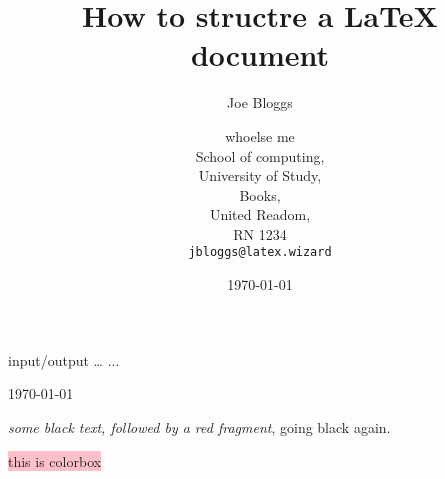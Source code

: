 \documentclass{article}
\title{How to structre a \LaTeX{} document}
\author{Joe Bloggs \and whoelse me \\
        School of computing, \\
        University of Study, \\
        Books, \\
        United Readom, \\
        RN 1234\\
        \texttt{jbloggs@latex.wizard}}
\date{\today}
\begin{document}
    \maketitle


    input\slash output
    \ldots
    ...

    \today

    \emph{some black text, \color{red} followed by a red fragment}, going black again.

    \colorbox{pink}{this is colorbox}
\end{document}
